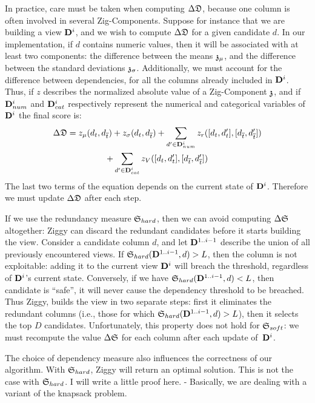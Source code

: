 In practice, care must be taken when computing $\Delta\mathfrak{D}$, because one
column is often involved in several Zig-Components. Suppose for instance that we
are building a view $\mathbf{D}^{i}$, and we wish to compute $\Delta\mathfrak{D}$ for
a given candidate $d$.  In our
implementation, if $d$ contains numeric values, then it will be associated with
at least two components: the difference between the means $\mathfrak{z}_\mu$, and the
difference between the standard deviations $\mathfrak{z}_\sigma$.  Additionally, we must
account for the difference between dependencies, for all the columns
already included in $\mathbf{D}^{i}$. Thus, if $z$ describes the normalized absolute
value of a Zig-Component $\mathfrak{z}$, and if $\mathbf{D}^{i}_{num}$ and
$\mathbf{D}^{i}_{cat}$ respectively represent the numerical and categorical
variables of $\mathbf{D}^{i}$ the final score is:
    \begin{multline}
\Delta\mathfrak{D} = 
z_\mu(d_t, d_{\overline{t}}) +
z_\sigma(d_t, d_{\overline{t}}) +
\sum_{d' \in \mathbf{D}^i_{num}} z_r([d_t, d_t'], [d_{\overline{t}}, d_{\overline{t}}']) \\
+ \sum_{d' \in \mathbf{D}^i_{cat}} z_V([d_t, d_t'], [d_{\overline{t}}, d_{\overline{t}}'])
\end{multline}
The last two terms of the equation depends on the current state of $ \mathbf{D}^i$.
Therefore we must update $\Delta\mathfrak{D}$ after each step.

If we use the redundancy measure $\mathfrak{S}_{hard}$, then we can avoid computing $
\Delta\mathfrak{S}$ altogether: Ziggy can discard the redundant candidates before
it starts building the view.  Consider a candidate column $d$,
and let $\mathbf{D}^{1..i-1}$ describe the union of all previously encountered
views. If $\mathfrak{S}_{hard} (\mathbf{D}^{1..i-1}, d) > L$, then the column is not
exploitable: adding it to the current view $\mathbf{D}^{i}$ will breach the
threshold, regardless of $\mathbf{D}^{i}$'s current state.  Conversely, if we have
$\mathfrak{S}_{hard}(\mathbf{D}^{1..i-1}, d) < L$, then candidate is ``safe'', it will
never cause the dependency threshold to be breached.  Thus Ziggy, builds the
view in two separate steps: first it eliminates the redundant columns (i.e.,
those for which $\mathfrak{S}_{hard} (\mathbf{D}^{1..i-1}, d) > L$), then it selects the
top $D$ candidates.  Unfortunately, this property does not hold for
$\mathfrak{S}_{soft}$: we must recompute the value $\Delta\mathfrak{S}$ for each column
after each update of~$\mathbf{D}^{i}$.

The choice of dependency measure also influences the correctness of our
algorithm. With $\mathfrak{S}_{hard}$, Ziggy will return an optimal solution. This is
not the case with $\mathfrak{S}_{hard}$.
{\color{red} I will write a little proof here. - Basically, we are dealing with
a variant of the knapsack problem.}

